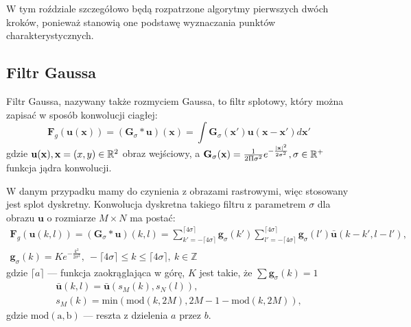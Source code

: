 W tym roździale szczegółowo będą rozpatrzone algorytmy pierwszych dwóch kroków, ponieważ stanowią one podstawę wyznaczania punktów charakterystycznych.

\subsection{Filtr Gaussa}

   Filtr Gaussa, nazywany także rozmyciem Gaussa, to filtr splotowy, który można zapisać w sposób konwolucji ciagłej:
   \begin{equation} \label{eq:gauss_c}
      \mathbf{F}_{g}(\mathbf{u}(\mathbf{x}))
      = (\mathbf{G}_{\sigma} * \mathbf{u}) (\mathbf{x})
      = \int \mathbf{G}_{\sigma}(\mathbf{x}') \mathbf{u}(\mathbf{x}-\mathbf{x}') d\mathbf{x}'
   \end{equation}
   gdzie $ \mathbf{u}(\mathbf{x}) , \smallskip \mathbf{x} = (x, y) \in \mathbb{R}^2 $ obraz wejściowy,
   a $ \mathbf{G}_{\sigma}(\mathbf{x}) = \frac{1}{2 \Pi \sigma^2} e^{-\frac{ | \mathbf{x} |^2}{2\sigma^2} },
   \smallskip \sigma \in \mathbb{R}^+ $ funkcja jądra konwolucji.

   W danym przypadku mamy do czynienia z obrazami rastrowymi, więc stosowany jest splot dyskretny. Konwolucja dyskretna takiego filtru z parametrem $\sigma$ dla obrazu $\mathbf{u}$ o rozmiarze $ M \times N $ ma postać:
   \begin{equation} \label{eq:gauss_d}
      \begin{split}
         \mathbf{F}_{g}(\mathbf{u}(k,l) )
         = (\mathbf{G}_{\sigma} * \mathbf{u}) (k,l) =
         \sum_{k' = -\lceil 4\sigma \rceil}^{\lceil 4\sigma \rceil} \mathbf{g}_{\sigma} (k')
         \sum_{l' = -\lceil 4\sigma \rceil}^{\lceil 4\sigma \rceil} \mathbf{g}_{\sigma} (l') \mathbf{\bar{u}} (k - k', l - l'),
         \\
         \mathbf{g}_{\sigma}(k) = Ke^{- \frac{k^2}{2 \sigma^2}}, \:
         -\lceil 4\sigma \rceil \leq k \leq \lceil 4\sigma \rceil, \:
         k \in \mathbb{Z}
      \end{split}
   \end{equation}
   gdzie $\lceil a \rceil$ --- funkcja zaokrąglająca w górę, $K$ jest takie, że $\sum \mathbf{g}_{\sigma} (k) = 1 $
   \begin{equation}
      \begin{split}
         \mathbf{\bar{u}}(k, l) =  \mathbf{\bar{u}} (s_M(k), s_N(l)),
         \\
         s_M(k) = \mathrm{min}(\mathrm{mod}(k, 2M), 2M - 1 - \mathrm{mod}(k, 2M)),
      \end{split}
   \end{equation}
   gdzie $ \mathrm{mod(a,b)} $ --- reszta z dzielenia $a$ przez $b$.

